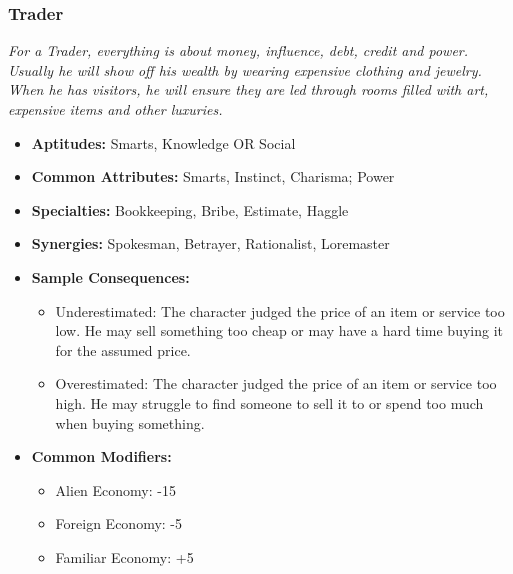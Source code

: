 \subsubsection{Trader}\label{Trader}
\textit{For a Trader, everything is about money, influence, debt, credit and power.
Usually he will show off his wealth by wearing expensive clothing and jewelry.
When he has visitors, he will ensure they are led through rooms filled with art, expensive items and other luxuries.}
\begin{itemize}
	\item \textbf{Aptitudes:} Smarts, Knowledge OR Social
	\item \textbf{Common Attributes:} Smarts, Instinct, Charisma; Power
	\item \textbf{Specialties:} Bookkeeping, Bribe, Estimate, Haggle
	\item \textbf{Synergies:} Spokesman, Betrayer, Rationalist, Loremaster
	\item \textbf{Sample Consequences:} 
	\begin{itemize}	
		\item Underestimated: The character judged the price of an item or service too low. He may sell something too cheap or may have a hard time buying it for the assumed price.
		\item Overestimated: The character judged the price of an item or service too high. He may struggle to find someone to sell it to or spend too much when buying something.
	\end{itemize}
	\item \textbf{Common Modifiers:}
	\begin{itemize}
		\item Alien Economy: -15
		\item Foreign Economy: -5
		\item Familiar Economy: +5 
	\end{itemize}
\end{itemize}

